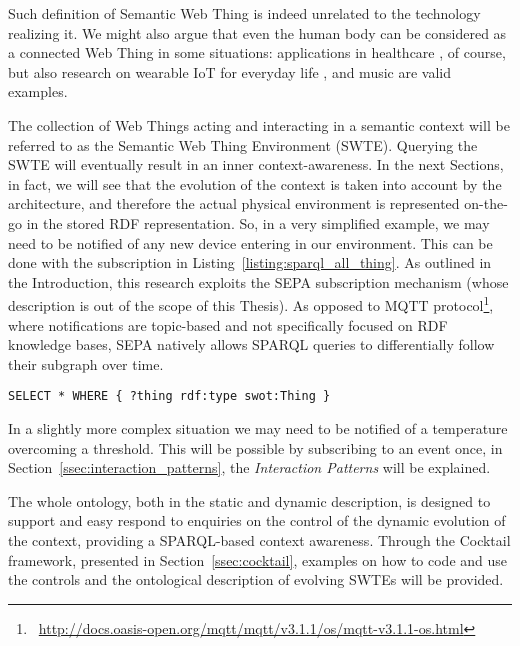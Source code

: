 Such definition of Semantic Web Thing is indeed unrelated to the technology realizing it. We might also argue that even the human body can be considered as a connected Web Thing in some situations: applications in healthcare \cite{antoniazzi2017web}, of course, but also research on wearable IoT for everyday life \cite{swan2012sensor}, \cite{gope2016bsn} and music \cite{turchet2017towards} are valid examples. 

The collection of Web Things acting and interacting in a semantic context will be referred to as the Semantic Web Thing Environment (SWTE). Querying the SWTE will eventually result in an inner context-awareness. In the next Sections, in fact, we will see that the evolution of the context is taken into account by the architecture, and therefore the actual physical environment is represented on-the-go in the stored RDF representation. So, in a very simplified example, we may need to be notified of any new device entering in our environment. This can be done with the subscription in Listing~\ref{listing:sparql_all_thing}. As outlined in the Introduction, this research exploits the SEPA subscription mechanism (whose description is out of the scope of this Thesis). As opposed to MQTT protocol\footnote{\faLink~\url{http://docs.oasis-open.org/mqtt/mqtt/v3.1.1/os/mqtt-v3.1.1-os.html}}, where notifications are topic-based and not specifically focused on RDF knowledge bases, SEPA natively allows SPARQL queries to differentially follow their subgraph over time.

\begin{lstlisting}[caption={SPARQL subscribe to list all Web Things available in the RDF store.},label=listing:sparql_all_thing]
SELECT * WHERE { ?thing rdf:type swot:Thing }
\end{lstlisting}

In a slightly more complex situation we may need to be notified of a temperature overcoming a threshold. This will be possible by subscribing to an event once, in Section~\ref{ssec:interaction_patterns}, the \textit{Interaction Patterns} will be explained. 

The whole  ontology, both in the static and dynamic description, is designed to support and easy respond to enquiries on the control of the dynamic evolution of the context, providing a SPARQL-based context awareness. Through the Cocktail framework, presented in Section~\ref{ssec:cocktail}, examples on how to code and use the controls and the ontological description of evolving SWTEs will be provided.

